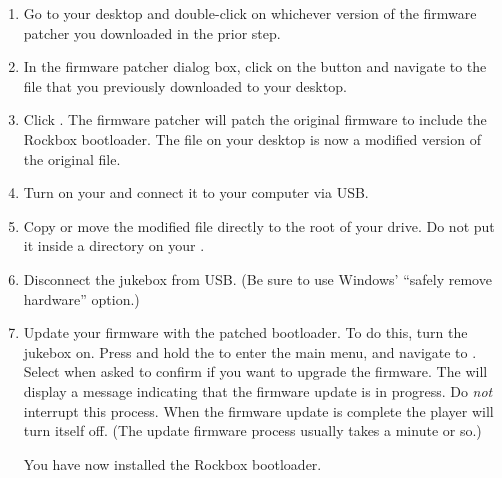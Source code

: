 \begin{enumerate}
{    downloading the alternate firmware patcher , which is 
    built without Unicode support.}
  \item Go to your desktop and double-click on whichever version of the firmware 
  patcher you downloaded in the prior step.
  \item In the firmware patcher dialog box, click on the 
  button and navigate
  to the  file that you previously downloaded to your desktop.
  \item Click . The firmware patcher will patch the
    original firmware to include the Rockbox bootloader. The 
    file on your desktop is now a modified version of the original
     file.
  \item Turn on your \playerman{} and connect it to your computer via USB.
  \item Copy or move the modified  file directly to the root of
    your \daps{} drive. Do not put it inside a directory on your \dap.
  \item Disconnect the jukebox from USB. (Be sure to use Windows' ``safely remove
  hardware'' option.)
  \item Update your \daps{} firmware with the patched bootloader. To do this, turn
    the jukebox on. Press and hold the
    to enter the main menu, and navigate to . Select  when asked to confirm if you want to upgrade the 
    firmware. The \playerman{} will display a message indicating that the
    firmware update 
    is in progress. Do \emph{not} interrupt this process. When the
    firmware update is complete the player will turn itself off. (The update
    firmware process usually takes a minute or so.)
    
    You have now installed the Rockbox bootloader.
\end{enumerate}


